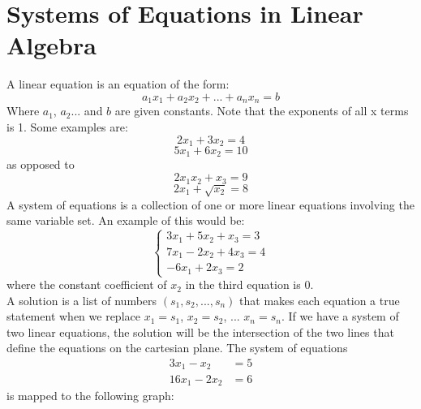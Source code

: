 \documentclass[nobib]{tufte-handout}
\begin{document}
\section{Systems of Equations in Linear Algebra}
A linear equation is an equation of the form:
\begin{equation*}
    a_1x_1+a_2x_2+...+a_nx_n=b
\end{equation*}
Where $a_1$, $a_2$... and $b$ are given constants.
Note that the exponents of all x terms is 1.
Some examples are:
\begin{equation*}
    2x_1+3x_2=4
\end{equation*}
\begin{equation*}
    5x_1+6x_2=10
\end{equation*}
as opposed to
\begin{equation*}
    2x_1x_2+x_3=9
\end{equation*}
\begin{equation*}
    2x_1+\sqrt{x_2}=8
\end{equation*}
A system of equations is a collection of one or more linear equations involving the same variable set.
An example of this would be:
$$ \begin{cases}
        3x_1 + 5x_2 + x_3 = 3  \\
        7x_1 - 2x_2 + 4x_3 = 4 \\
        -6x_1 + 2x_3 = 2
    \end{cases} $$
where the constant coefficient of $x_2$ in the third equation is 0.\\
A solution is a list of numbers $(s_1, s_2, ..., s_n)$ that makes each equation a true statement when we replace $x_1=s_1$, $x_2=s_2$, ... $x_n=s_n$.
If we have a system of two linear equations, the solution will be the intersection of the two lines that define the equations on the cartesian plane. The system of equations
\begin{align*}
    3x_1-x_2   & = 5 \\
    16x_1-2x_2 & = 6
\end{align*}
is mapped to the following graph:
\begin{center}
\end{center}
\end{document}
